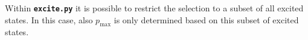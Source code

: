 \documentclass[a4paper,11pt,DIV=15,openany,twoside=false]{scrbook}
\newcommand{\tthdump}[1]{#1}
\newcommand{\ttt}[1]{\textbf{\texttt{#1}}}
\newcommand{\VEC}[1]{\ensuremath{\mathbf{#1}}}
\begin{document}
Within \ttt{excite.py} it is possible to restrict the selection to a subset of all excited states. In this case, also $p_{\text{max}}$ is only determined based on this subset of excited states.


% 
% 
\end{document}
